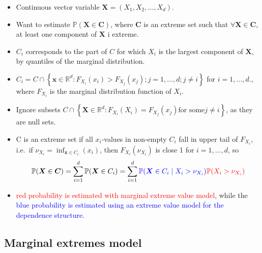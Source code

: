 \documentclass{article}
\begin{document}
\begin{itemize} 
  \item Continuous vector variable $\bm{X} = (X_1, X_2, \ldots, X_d)$. 
  \item Want to estimate $\mathbb{P}(\bm{X} \in \bm{C})$, where $\bm{C}$ is an extreme set such that $\forall \bm{X} \in \bm{C}$, at least one component of $\bm{X}$ i extreme. 
  \item $C_i$ corresponds to the part of $C$ for which $X_i$ is the largest component of $\bm{X}$, by quantiles of the marginal distribution. 
  \item $C_i = C \cap \left\{ \bm{x} \in \mathbb{R}^d: F_{X_i}(x_i) > F_{X_j}(x_j); j = 1, \ldots, d; j \ne i \right\}$ for $i = 1, \ldots, d$., where $F_{X_i}$ is the marginal distribution function of $X_i$. %
  \item Ignore subsets $C \cap \left\{ \bm{X} \in \mathbb{R}^d: F_{X_i}(X_i) = F_{X_j}(x_j) \text{for some} j \ne i \right\}$, as they are null sets. 
  \item C is an extreme set if all $x_i$-values in non-empty $C_i$ fall in upper tail of $F_{X_i}$, i.e.\ if $\nu_{X_i} = \inf_{\bm{x} \in C_i}{(x_i)}$, then $F_{X_i}(\nu_{X_i})$ is close 1 for $i = 1, \ldots, d$, so 
  \[
  \mathbb{P}(\bm{X} \in \bm{C}) = \sum_{i=1}^{d}{\mathbb{P}(\bm{X} \in C_i)} = \sum_{i=1}^{d}\textcolor{blue}{\mathbb{P}(\bm{X} \in C_i\mid X_i > \nu_{X_i})}\textcolor{red}{\mathbb{P}(X_i> \nu_{X_i})}
  \]
  \item \textcolor{red}{red probability is estimated with marginal extreme value model}, while the \textcolor{blue}{blue probability is estimated using an extreme value model for the dependence structure}. 
\end{itemize}

\subsection{Marginal extremes model}
\end{document}
